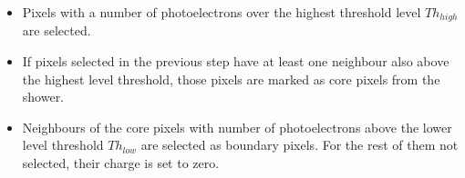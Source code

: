 \documentclass[main.tex]{subfiles}
\begin{document}
\begin{itemize}

\item Pixels with a number of photoelectrons over the highest threshold level $Th_{high}$ are selected.
\item If pixels selected in the previous step have at least one neighbour also above the highest level threshold, those pixels are marked as core pixels from the shower.

 \item Neighbours of the core pixels with number of photoelectrons above the lower level threshold $Th_{low}$ are selected as boundary pixels. For the rest of them not selected, their charge is set to zero. \\
\end{itemize}
   
\end{document}
